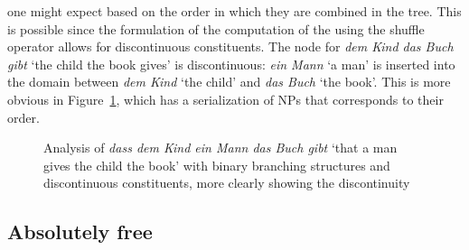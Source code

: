 \documentclass[output=paper,biblatex,babelshorthands,newtxmath,draftmode,colorlinks,citecolor=brown]{langscibook}
\begin{document}
one might expect based on the order in which they are combined in the
tree. This is possible since the formulation of the computation of the \domv using the shuffle
operator allows for discontinuous constituents. The node for \emph{dem Kind das Buch gibt} `the
child the book gives' is discontinuous: \emph{ein Mann} `a man' is inserted into the domain between
\emph{dem Kind} `the child' and \emph{das Buch} `the book'.  This is more obvious in Figure~\ref{fig-the-child-reads-the-book-reape-binary-discont}, which has a serialization of NPs that
corresponds to their order.
\begin{figure}
\caption{\label{fig-the-child-reads-the-book-reape-binary-discont}Analysis of \emph{dass dem Kind ein Mann das Buch
    gibt} `that a man gives the child the book' with binary branching structures and discontinuous
  constituents, more clearly showing the discontinuity}
\end{figure}%


\subsection{Absolutely free}
\label{sec-absolutely-free}\label{sec-warlpiri}
\end{document}
